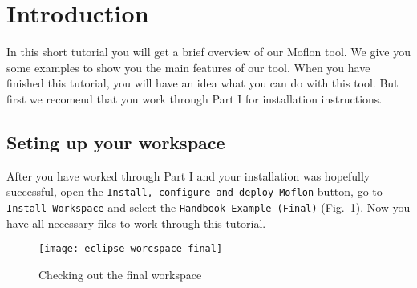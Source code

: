 \section{Introduction}
In this short tutorial you will get a brief overview of our Moflon tool. We give you some examples to show you the main features of our tool. When you have finished this tutorial, you will have an idea what you can do with this tool.
\newline
But first we recomend that you work through Part I for installation instructions.


\subsection{Seting up your workspace}
After you have worked through Part I and your installation was hopefully successful, open the \texttt{Install, configure and deploy Moflon} button, go to \texttt{Install Workspace} and select the \texttt{Handbook Example (Final)} (Fig.~\ref{demo_workspace}). Now you have all necessary files to work through this tutorial.

\begin{figure}[htbp]
	\centering
  \texttt{[image: eclipse\_worcspace\_final]}
	\caption{Checking out the final workspace} 
	\label{demo_workspace} 
\end{figure}

